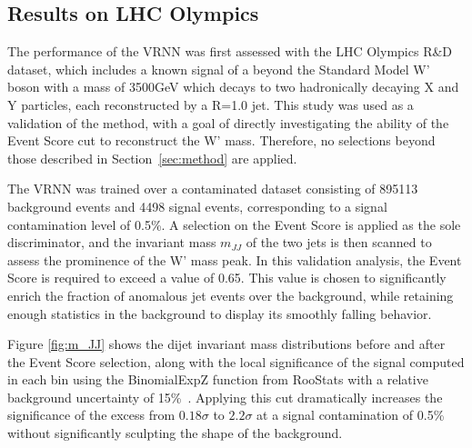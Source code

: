 \documentclass[letterpaper,11pt]{article}
\begin{document}
\subsection{Results on LHC Olympics}
\label{sec:results}


The performance of the VRNN was first assessed with the LHC Olympics R\&D dataset, which includes a known signal of a beyond the Standard Model W' boson with a mass of 3500GeV which decays to two hadronically decaying X and Y particles, each reconstructed by a R=1.0 jet.
This study was used as a validation of the method, with a goal of directly investigating the ability of the Event Score cut to reconstruct the W' mass. 
Therefore, no selections beyond those described in Section~\ref{sec:method} are applied.


The VRNN was trained over a contaminated dataset consisting of 895113 background events and 4498 signal events, corresponding to a signal contamination level of 0.5\%.
A selection on the Event Score is applied as the sole discriminator, and the invariant mass $m_{JJ}$ of the two jets is then scanned to assess the prominence of the W' mass peak.
In this validation analysis, the Event Score is required to exceed a value of 0.65. 
This value is chosen to significantly enrich the fraction of anomalous jet events over the background, while retaining enough statistics in the background to display its smoothly falling behavior.

Figure \ref{fig:m_JJ} shows the dijet invariant mass distributions before and after the Event Score selection, along with the local significance of the signal computed in each bin using the {\sc BinomialExpZ} function from {\sc RooStats} with a relative background uncertainty of 15\%~\cite{moneta2011roostats}.
Applying this cut dramatically increases the significance of the excess from $0.18\sigma$ to $2.2\sigma$ at a signal contamination of 0.5\% without significantly sculpting the shape of the background.
\end{document}
